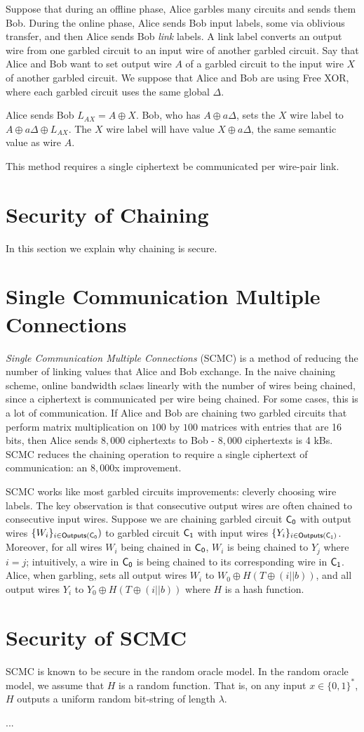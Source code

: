 Suppose that during an offline phase, Alice garbles many circuits and sends them Bob.
During the online phase, Alice sends Bob input labels, some via oblivious transfer, and then Alice sends Bob \textit{link} labels.
A link label converts an output wire from one garbled circuit to an input wire of another garbled circuit.
Say that Alice and Bob want to set output wire $A$ of a garbled circuit to the input wire $X$ of another garbled circuit.
We suppose that Alice and Bob are using Free XOR, where each garbled circuit uses the same global $\Delta$.

Alice sends Bob $L_{AX} = A \oplus X$.
Bob, who has $A \oplus a\Delta$, sets the $X$ wire label to $A \oplus a\Delta \oplus L_{AX}$.
The $X$ wire label will have value $X \oplus a\Delta$, the same semantic value as wire $A$.

This method requires a single ciphertext be communicated per wire-pair link.

\section{Security of Chaining}
In this section we explain why chaining is secure.

\section{Single Communication Multiple Connections}
\textit{Single Communication Multiple Connections} (SCMC) is a method of reducing the number of linking values that Alice and Bob exchange.
In the naive chaining scheme, online bandwidth sclaes linearly with the number of wires being chained, since a ciphertext is communicated per wire being chained.
For some cases, this is a lot of communication.
If Alice and Bob are chaining two garbled circuits that perform matrix multiplication on $100$ by $100$ matrices with entries that are 16 bits, then Alice sends $8,000$ ciphertexts to Bob - $8,000$ ciphertexts is 4 kBs.
SCMC reduces the chaining operation to require a single ciphertext of communication: an $8,000$x improvement.

SCMC works like most garbled circuits improvements: cleverly choosing wire labels.
The key observation is that consecutive output wires are often chained to consecutive input wires.
Suppose we are chaining garbled circuit $\sf {C}_0$ with output wires $\{W_i\}_{i \in {\sf {Outputs}}(\sf {C}_0})$ to garbled circuit $\sf {C}_1$ with input wires $\{Y_i\}_{i \in {\sf {Outputs}}(\sf {C}_1)}$.
Moreover, for all wires $W_i$ being chained in $\sf {C}_0$, $W_i$ is being chained to $Y_j$ where $i = j$; intuitively, a wire in $\sf {C}_0$ is being chained to its corresponding wire in $\sf {C}_1$.
Alice, when garbling, sets all output wires $W_i$ to $W_0 \oplus H(T \oplus (i || b))$, and all output wires $Y_i$ to $Y_0 \oplus H(T \oplus (i || b))$ where $H$ is a hash function.

\section{Security of SCMC}
SCMC is known to be secure in the random oracle model.
In the random oracle model, we assume that $H$ is a random function.
That is, on any input $x \in \{0,1\}^*$, $H$ outputs a uniform random bit-string of length $\lambda$.

...


